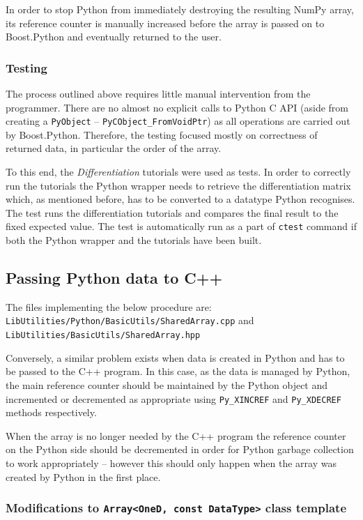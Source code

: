 In order to stop Python from immediately destroying the resulting NumPy array, its reference counter 
is manually increased before the array is passed on to Boost.Python and eventually returned to the user.

\subsubsection{Testing}

The process outlined above requires little manual intervention from the programmer. There are no almost 
no explicit calls to Python C API (aside from creating a \texttt{PyObject} -- \texttt{PyCObject\_FromVoidPtr}) 
as all operations are carried out by Boost.Python. Therefore, the testing focused mostly on correctness 
of returned data, in particular the order of the array.

To this end, the \emph{Differentiation} tutorials were used as tests. In order to correctly run the 
tutorials the Python wrapper needs to retrieve the differentiation matrix which, as mentioned before, 
has to be converted to a datatype Python recognises. The test runs the differentiation tutorials and 
compares the final result to the fixed expected value. The test is automatically run as a part of 
\texttt{ctest} command if both the Python wrapper and the tutorials have been built.

\subsection{Passing Python data to C++} 
The files implementing the below procedure are: \texttt{LibUtilities/Python/BasicUtils/SharedArray.cpp} and \texttt{LibUtilities/BasicUtils/SharedArray.hpp}

Conversely, a similar problem exists when data is created in Python and has to be passed to 
the C++ program. In this case, as the data is managed by Python, the main reference counter 
should be maintained by the Python object and incremented or decremented as appropriate 
using \texttt{Py\_XINCREF} and \texttt{Py\_XDECREF} methods respectively.

When the array is no longer needed by the C++ program the reference counter on the Python 
side should be decremented in order for Python garbage collection to work appropriately 
-- however this should only happen when the array was created by Python in the first place. 

\subsubsection{Modifications to \texttt{Array<OneD, const DataType>} class template}

